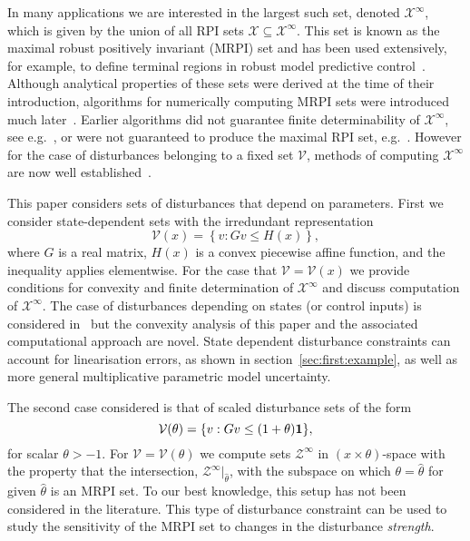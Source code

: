 \documentclass[letterpaper, 10pt, conference]{ieeeconf} %
\begin{document}
In many applications we are interested in the largest such set, denoted $\mathcal X^\infty$, which is given 
by the union of all RPI sets $\mathscr X\subseteq\mathcal X^\infty$. This set is known as the maximal robust 
positively invariant (MRPI) set and has been used extensively, for example, to define terminal regions in 
robust model predictive control~\cite{mayne:2000}. Although analytical properties
of these sets were derived at the time of their introduction, algorithms for numerically computing MRPI sets 
were introduced much later~\cite{Blanchini:1994,DeSantis:1994,Kolmanovsky:1998}. 
Earlier algorithms did not guarantee finite determinability of $\mathcal X^\infty$, see e.g.~\cite{Blanchini:1990}, 
or were not guaranteed to produce the maximal RPI set, e.g.~\cite{Blanchini:1991}. 
%
However for the case of disturbances belonging to a fixed set $\mathscr V$, methods of computing 
$\mathcal X^\infty$ are now well established~\cite{blanchini:2007}.

This paper considers sets of disturbances that depend on
parameters. First we consider state-dependent sets with the irredundant representation
\begin{equation}\label{eq:PWA:disturbance:set}
	\mathcal V(x) = \left\{v: Gv\leq H(x)\right\},
\end{equation}
where $G$ is a real matrix,
$H(x)$ is a convex piecewise affine function, and the inequality applies elementwise. For the case that $\mathscr V=\mathcal V(x)$ we
provide conditions for convexity and finite determination of $\mathcal X^\infty$ and discuss 
computation of $\mathcal X^\infty$. The case of disturbances depending on states (or control inputs) 
is considered in~\cite{Kuntsevich:1995,rakovic06} but the convexity
analysis of this paper and the associated computational approach are novel. 
State dependent disturbance constraints can account for linearisation errors, as shown in section~\ref{sec:first:example}, 
as well as more general multiplicative parametric model uncertainty.

The second case considered is that of scaled disturbance sets of the form
\begin{equation}
  \mathcal V(\theta) = \{v:Gv\leq(1+\theta){\bf{1}}\},
\end{equation}
for scalar $\theta>-1$. For $\mathscr V = \mathcal V(\theta)$ we compute sets $\mathcal Z^\infty$ in 
$(x\times\theta)$-space with the property that 
the intersection, $\mathcal Z^\infty\vert_{\hat\theta}$, with the subspace on which $\theta=\hat\theta$ 
for given $\hat\theta$ is an MRPI set. To our best knowledge, this setup has not been 
considered in the literature. This type of disturbance constraint can be used to study the sensitivity of
the MRPI set to changes in the disturbance \emph{strength}.
\end{document}

